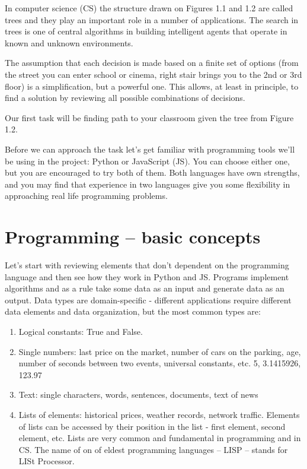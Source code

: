 In computer science (CS) the structure drawn on Figures 1.1 and 1.2
are called trees and
they play an important role in a number of applications.
The search in trees is one of central algorithms in building
intelligent agents that operate in known and unknown environments.

The assumption that each decision is made based
on a finite set of options (from the street you can enter school or cinema,
right stair brings you to the 2nd or 3rd floor) is a simplification,
but a powerful one. This allows,
at least in principle, to find a solution by reviewing all possible
combinations of decisions.

Our first task will be finding path to your classroom
given the tree from Figure 1.2.

Before we can approach the task let's get familiar with
programming tools we'll be using in the project: Python or
JavaScript (JS). You can choose either one,
but you are encouraged to try both of them.
Both languages have own strengths, and you may find that
experience in two languages give you some flexibility in
approaching real life programming problems.

\section{Programming -- basic concepts}

Let's start with reviewing elements that don't dependent
on the programming language and then see how they work in
Python and JS. Programs implement algorithms and
as a rule take some data as an input and generate data as an output.
Data types are domain-specific - different applications require
different data elements and
data organization, but the most common types are:

\begin{leftborder}
\begin{enumerate}
\item Logical constants: True and False.
\item Single numbers: last price on the market, number of
cars on the parking, age, number of seconds between two events,
universal constants, etc. 5, 3.1415926, 123.97
\item Text: single characters, words, sentences, documents, text of news
\item Lists of elements: historical prices, weather records,
network traffic. Elements of lists can be accessed by their
position in the list - first element, second element, etc.
Lists are very common and fundamental in programming and in CS.
The name of on of eldest programming languages -- LISP --
stands for LISt Processor.
\end{enumerate}
\end{leftborder}

